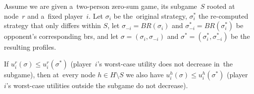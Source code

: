 \begin{thm}
  \label{thm:perf-info-subgames-unexploitability}
  Assume we are given a~two-person zero-sum game, its subgame~$S$ rooted at node~$r$ and a~fixed player~$i$.
  Let $\sigma_i$ be the~original strategy, $\sigma_i^*$ the re-computed strategy that only differs within $S$, let $\sigma_{-i} = BR(\sigma _{i})$ and $\sigma_{-i}^* = BR(\sigma^*_{i})$ be opponent's corresponding \acrlong{br}s, and let $\sigma = (\sigma_i, \sigma_{-i})$ and $\sigma^* = (\sigma_i^*, \sigma_{-i}^*)$ be the resulting profiles.

  If $u_i^r (\sigma) \le u_i^r (\sigma^*)$ (player~$i$'s worst-case utility does not decrease in~the subgame), then at~every node $h \in H \setminus S$ we also have $u_i^h (\sigma) \le u_i^h (\sigma^*)$ (player~$i$'s worst-case utilities outside the subgame do not decrease).
\end{thm}

